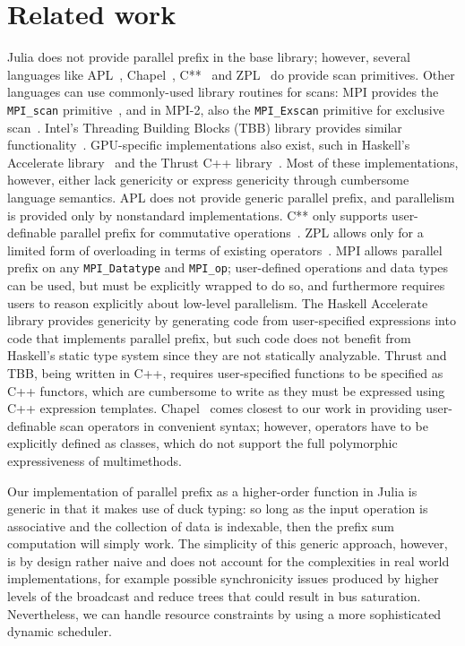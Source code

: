\documentclass{sig-alternate}
\newcommand{\code}[1]{\texttt{#1}}
\begin{document}
\section{Related work}

Julia does not provide parallel prefix in the base library; however, several
languages like APL~\cite{Iverson1962,Iverson1979}, Chapel~\cite{Deitz2006},
C**~\cite{Viswanathan1996} and ZPL~\cite{Chamberlain2000,Deitz2002} do provide
scan primitives. Other languages can use commonly-used library routines for
scans: MPI provides the \code{MPI\_scan} primitive~\cite{Snir1995,MPI}, and in
MPI-2, also the \code{MPI\_Exscan} primitive for exclusive scan~\cite{MPI2}.
Intel's Threading Building Blocks (TBB) library provides similar
functionality~\cite{Reinders2007}.  GPU-specific implementations also exist,
such in Haskell's Accelerate library~\cite{Chakravarty2011} and the Thrust C++
library~\cite{Bell2012}. Most of these implementations, however, either lack
genericity or express genericity through cumbersome language semantics. APL
does not provide generic parallel prefix, and parallelism is provided only by
nonstandard implementations. C** only supports user-definable parallel prefix
for commutative operations~\cite{Viswanathan1996}. ZPL allows only for a
limited form of overloading in terms of existing
operators~\cite{Deitz2002,Deitz2006}.  MPI allows parallel prefix on any
\code{MPI\_Datatype} and \code{MPI\_op}; user-defined operations and data types
can be used, but must be explicitly wrapped to do so, and furthermore requires
users to reason explicitly about low-level parallelism. The Haskell Accelerate
library provides genericity by generating code from user-specified expressions
into code that implements parallel prefix, but such code does not benefit from
Haskell's static type system since they are not statically analyzable. Thrust
and TBB, being written in C++, requires user-specified functions to be
specified as C++ functors, which are cumbersome to write as they must be
expressed using C++ expression templates. Chapel~\cite{Deitz2006} comes
closest to our work in providing user-definable scan operators in convenient
syntax; however, operators have to be explicitly defined as classes, which do
not support the full polymorphic expressiveness of multimethods.

Our implementation of parallel prefix as a higher-order function in Julia is
generic in that it makes use of duck typing: so long as the input operation is
associative and the collection of data is indexable, then the prefix sum
computation will simply work. The simplicity of this generic approach, however,
is by design rather naive and does not account for the complexities in real
world implementations, for example possible synchronicity issues produced
by higher levels of the broadcast and reduce trees that could result in bus
saturation. Nevertheless, we can handle resource constraints by using a more
sophisticated dynamic scheduler.
\end{document}
